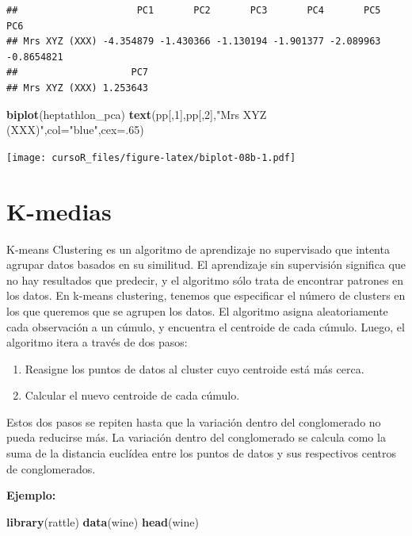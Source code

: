 \documentclass[]{book}
\newenvironment{Shaded}{\begin{snugshade}}{\end{snugshade}}
\newcommand{\KeywordTok}[1]{\textcolor[rgb]{0.13,0.29,0.53}{\textbf{#1}}}
\newcommand{\DataTypeTok}[1]{\textcolor[rgb]{0.13,0.29,0.53}{#1}}
\newcommand{\DecValTok}[1]{\textcolor[rgb]{0.00,0.00,0.81}{#1}}
\newcommand{\StringTok}[1]{\textcolor[rgb]{0.31,0.60,0.02}{#1}}
\newcommand{\NormalTok}[1]{#1}
\begin{document}
\begin{verbatim}
##                     PC1       PC2       PC3       PC4       PC5        PC6
## Mrs XYZ (XXX) -4.354879 -1.430366 -1.130194 -1.901377 -2.089963 -0.8654821
##                    PC7
## Mrs XYZ (XXX) 1.253643
\end{verbatim}

\begin{Shaded}
\begin{Highlighting}[]
\KeywordTok{biplot}\NormalTok{(heptathlon_pca)}
\KeywordTok{text}\NormalTok{(pp[,}\DecValTok{1}\NormalTok{],pp[,}\DecValTok{2}\NormalTok{],}\StringTok{"Mrs XYZ (XXX)"}\NormalTok{,}\DataTypeTok{col=}\StringTok{"blue"}\NormalTok{,}\DataTypeTok{cex=}\NormalTok{.}\DecValTok{65}\NormalTok{)}
\end{Highlighting}
\end{Shaded}

\texttt{[image: cursoR\_files/figure-latex/biplot-08b-1.pdf]}

\section{K-medias}\label{k-medias}

K-means Clustering es un algoritmo de aprendizaje no supervisado que
intenta agrupar datos basados en su similitud. El aprendizaje sin
supervisión significa que no hay resultados que predecir, y el algoritmo
sólo trata de encontrar patrones en los datos. En k-means clustering,
tenemos que especificar el número de clusters en los que queremos que se
agrupen los datos. El algoritmo asigna aleatoriamente cada observación a
un cúmulo, y encuentra el centroide de cada cúmulo. Luego, el algoritmo
itera a través de dos pasos:

\begin{enumerate}
\def\labelenumi{\arabic{enumi}.}
\item
  Reasigne los puntos de datos al cluster cuyo centroide está más cerca.
\item
  Calcular el nuevo centroide de cada cúmulo.
\end{enumerate}

Estos dos pasos se repiten hasta que la variación dentro del
conglomerado no pueda reducirse más. La variación dentro del
conglomerado se calcula como la suma de la distancia euclídea entre los
puntos de datos y sus respectivos centros de conglomerados.

\textbf{Ejemplo:}

\begin{Shaded}
\begin{Highlighting}[]
\KeywordTok{library}\NormalTok{(rattle)}
\KeywordTok{data}\NormalTok{(wine)}
\KeywordTok{head}\NormalTok{(wine)}
\end{Highlighting}
\end{Shaded}
\end{document}
